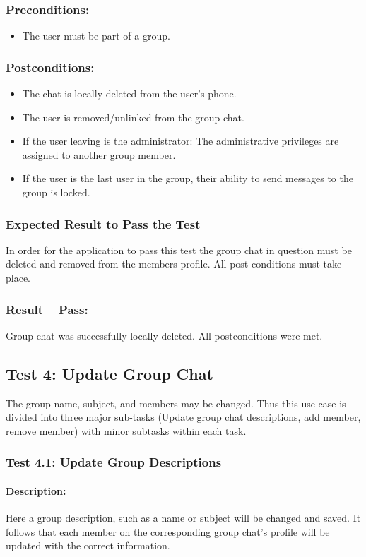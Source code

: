 \documentclass[11pt]{article}
\begin{document}
\subsubsection{Preconditions:} 
\begin{itemize}
\item The user must be part of a group.
\end{itemize}
\subsubsection{Postconditions:}
\begin{itemize}
\item The chat is locally deleted from the user's phone.
\item The user is removed/unlinked from the group chat.
\item If the user leaving is the administrator: The administrative privileges are assigned to another group member.
\item If the user is the last user in the group, their ability to send messages  to the group is locked.
\end{itemize}
\subsubsection{Expected Result to Pass the Test}
In order for the application to pass this test the group chat in question must be deleted and removed from the members profile. All post-conditions must take place.
\subsubsection{Result -- Pass:} Group chat was successfully locally deleted. All postconditions were met.

\subsection{Test 4: Update Group Chat}
The group name, subject, and members may be changed. Thus this use case is divided into three major sub-tasks (Update group chat descriptions, add member, remove member) with minor subtasks within each task.
\subsubsection{Test 4.1: Update Group Descriptions}
\paragraph{Description:} Here a group description, such as a name or subject will be changed and saved. It follows that each member on the corresponding group chat's profile will be updated with the correct information.
\end{document}
